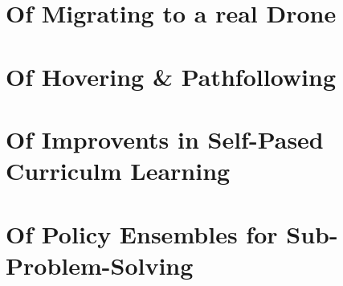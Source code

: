 \section{Of Migrating to a real Drone}

\newpage

\section{Of Hovering \& Pathfollowing}

\newpage

\section{Of Improvents in Self-Pased Curriculm Learning}

\newpage

\section{Of Policy Ensembles for Sub-Problem-Solving}
